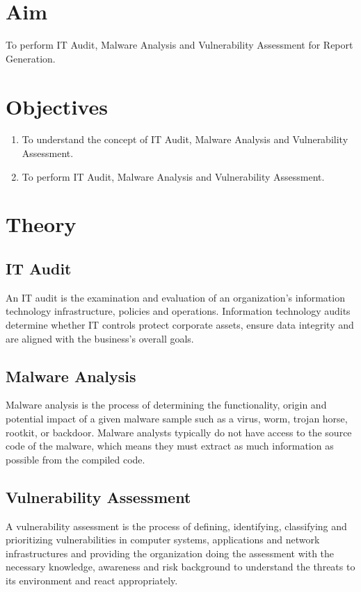 \documentclass[11pt]{article}
\begin{document}
\tableofcontents
\thispagestyle{empty}
\clearpage

\setcounter{page}{1}

\section{Aim}
To perform IT Audit, Malware Analysis and Vulnerability Assessment for Report Generation.
\section{Objectives}
\begin{enumerate}
    \item To understand the concept of IT Audit, Malware Analysis and Vulnerability Assessment.
    \item To perform IT Audit, Malware Analysis and Vulnerability Assessment.
\end{enumerate}

\section{Theory}
\subsection{IT Audit}
An IT audit is the examination and evaluation of an organization's information technology infrastructure, policies and operations. Information technology audits determine whether IT controls protect corporate assets, ensure data integrity and are aligned with the business's overall goals.

\subsection{Malware Analysis}

Malware analysis is the process of determining the functionality, origin and potential impact of a given malware sample such as a virus, worm, trojan horse, rootkit, or backdoor. Malware analysts typically do not have access to the source code of the malware, which means they must extract as much information as possible from the compiled code.

\subsection{Vulnerability Assessment}
A vulnerability assessment is the process of defining, identifying, classifying and prioritizing vulnerabilities in computer systems, applications and network infrastructures and providing the organization doing the assessment with the necessary knowledge, awareness and risk background to understand the threats to its environment and react appropriately.
\end{document}
